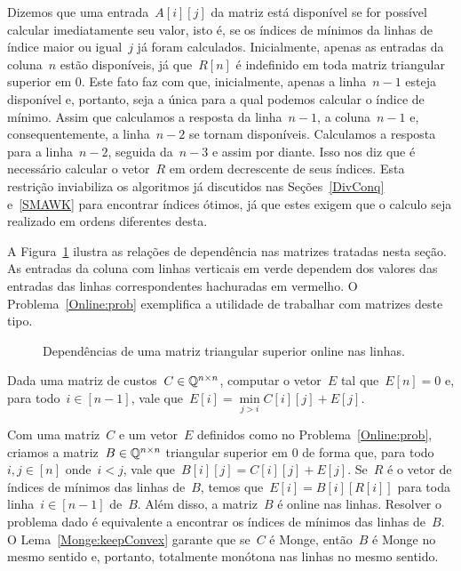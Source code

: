 Dizemos que uma entrada~$A[i][j]$ da matriz está disponível se for possível calcular imediatamente seu valor, isto é, se os índices de mínimos da linhas de índice maior ou igual~$j$ já foram calculados. Inicialmente, apenas as entradas da coluna~$n$ estão disponíveis, já que~$R[n]$ é indefinido em toda matriz triangular superior em 0. Este fato faz com que, inicialmente, apenas a linha~$n-1$ esteja disponível e, portanto, seja a única para a qual podemos calcular o índice de mínimo. Assim que calculamos a resposta da linha~$n-1$, a coluna~$n-1$ e, consequentemente, a linha~$n-2$ se tornam disponíveis. Calculamos a resposta para a linha~$n-2$, seguida da~$n-3$ e assim por diante. Isso nos diz que é necessário calcular o vetor~$R$ em ordem decrescente de seus índices. Esta restrição inviabiliza os algoritmos já discutidos nas Seções~\ref{DivConq} e~\ref{SMAWK} para encontrar índices ótimos, já que estes exigem que o calculo seja realizado em ordens diferentes desta.

A Figura~\ref{Online:matrix:fig} ilustra as relações de dependência nas matrizes tratadas nesta seção. As entradas da coluna com linhas verticais em verde dependem dos valores das entradas das linhas correspondentes hachuradas em vermelho. O Problema~\ref{Online:prob} exemplifica a utilidade de trabalhar com matrizes deste tipo.

\begin{figure}[h]
    \centering
    
    \caption{Dependências de uma matriz triangular superior online nas linhas.} \label{Online:matrix:fig}
\end{figure}

\begin{prob} \label{Online:prob}
Dada uma matriz de custos~$C \in \mathbb{Q}^{n \times n}$, computar o vetor~$E$ tal que~$E[n] = 0$ e, para todo~$i \in [n-1]$, vale que~$E[i] = \min\limits_{j > i} C[i][j] + E[j]$.
\end{prob}

Com uma matriz~$C$ e um vetor~$E$ definidos como no Problema~\ref{Online:prob}, criamos a matriz~$B \in \mathbb{Q}^{n \times n}$ triangular superior em 0 de forma que, para todo~$i,j \in [n]$ onde~$i < j$, vale que~$B[i][j] = C[i][j] + E[j]$. Se~$R$ é o vetor de índices de mínimos das linhas de~$B$, temos que~$E[i] = B[i][R[i]]$ para toda linha~$i \in [n-1]$ de~$B$. Além disso, a matriz~$B$ é online nas linhas. Resolver o problema dado é equivalente a encontrar os índices de mínimos das linhas de~$B$. O Lema~\ref{Monge:keepConvex} garante que se~$C$ é Monge, então~$B$ é Monge no mesmo sentido e, portanto, totalmente monótona nas linhas no mesmo sentido.

